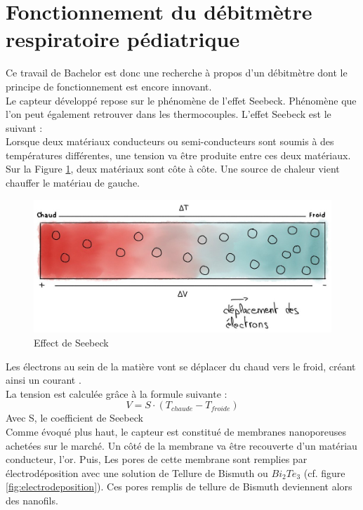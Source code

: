 \section{Fonctionnement du débitmètre respiratoire pédiatrique}
Ce travail de Bachelor est donc une recherche à propos d'un débitmètre dont le principe de fonctionnement est encore innovant. \\

Le capteur développé repose sur le phénomène de l'effet Seebeck. Phénomène que l'on peut également retrouver dans les thermocouples. L'effet 
Seebeck est le suivant :\\
Lorsque deux matériaux conducteurs ou semi-conducteurs sont soumis à des températures différentes, une tension va être produite entre ces deux matériaux. \\
Sur la Figure \ref{fig:Seebeck}, deux matériaux sont côte à côte. Une source de chaleur vient chauffer le matériau de gauche. 
\begin{figure}[H]
    \centering
    \includegraphics[scale = 0.3]{images/Seebeck.jpg}
    \caption{Effect de Seebeck}
    \label{fig:Seebeck}
\end{figure}
Les électrons au sein de la matière vont se déplacer du chaud vers le froid, créant ainsi un courant \cite{instrumentys_effet_2021}.\\
La tension est calculée grâce à la formule suivante :
\[V = S \cdot (T_{chaude} - T_{froide})\]
Avec S, le coefficient de Seebeck\\
Comme évoqué plus haut, le capteur est constitué de membranes nanoporeuses achetées sur le marché. 
Un côté de la membrane va être recouverte d'un matériau conducteur, l'or. Puis, Les pores de cette membrane sont remplies par 
électrodéposition avec une solution de Tellure de Bismuth ou $Bi_2Te_3$ (cf. figure \ref{fig:electrodeposition}). Ces pores remplis de tellure de 
Bismuth deviennent alors des nanofils. 
